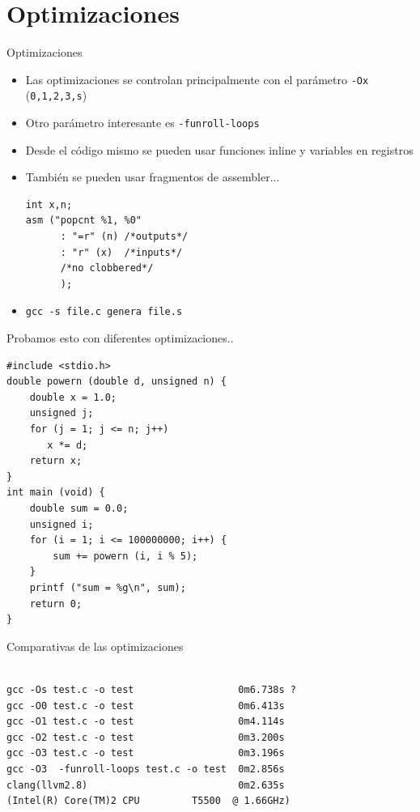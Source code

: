 \documentclass[xetex]{beamer}
\begin{document}
\section{Optimizaciones}

\begin{frame}[fragile]{Optimizaciones}
\begin{itemize}
  \item Las optimizaciones se controlan principalmente con el parámetro \verb=-Ox= (\verb=0,1,2,3,s=)
  \item Otro parámetro interesante es \verb=-funroll-loops=
  \item Desde el código mismo se pueden usar funciones inline y variables en registros
  \item También se pueden usar fragmentos de assembler...
\begin{verbatim}
int x,n;
asm ("popcnt %1, %0"
      : "=r" (n) /*outputs*/
      : "r" (x)  /*inputs*/
      /*no clobbered*/
      );
\end{verbatim}
  \item \verb=gcc -s file.c genera file.s=
\end{itemize}

  
\end{frame}
\begin{frame}[fragile]{Probamos esto con diferentes optimizaciones..}
  
\begin{lstlisting}
#include <stdio.h>
double powern (double d, unsigned n) {
    double x = 1.0;
    unsigned j;
    for (j = 1; j <= n; j++)
       x *= d;
    return x;
}
int main (void) {
    double sum = 0.0;
    unsigned i;
    for (i = 1; i <= 100000000; i++) {
        sum += powern (i, i % 5);
    }
    printf ("sum = %g\n", sum);
    return 0;
}
\end{lstlisting} 
\end{frame}
\begin{frame}[fragile]{Comparativas de las optimizaciones}
  

\begin{verbatim}

gcc -Os test.c -o test                  0m6.738s ?
gcc -O0 test.c -o test                  0m6.413s
gcc -O1 test.c -o test                  0m4.114s
gcc -O2 test.c -o test                  0m3.200s
gcc -O3 test.c -o test                  0m3.196s
gcc -O3  -funroll-loops test.c -o test  0m2.856s
clang(llvm2.8)                          0m2.635s
(Intel(R) Core(TM)2 CPU         T5500  @ 1.66GHz)
\end{verbatim}

  
\end{frame}
\end{document}
